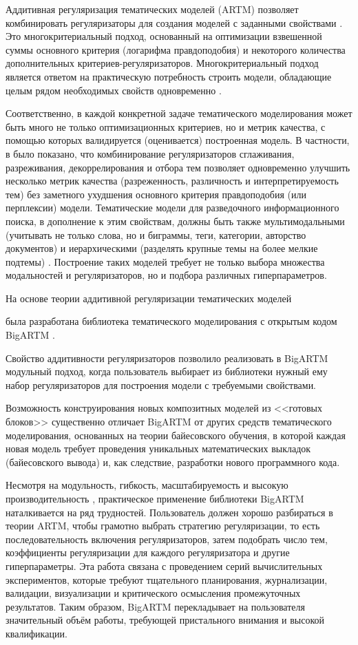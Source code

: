 Аддитивная регуляризация тематических моделей (ARTM) позволяет комбинировать регуляризаторы для создания моделей с заданными свойствами \cite{vorontsov2014additive,voron15mlj}. Это многокритериальный подход, основанный на оптимизации взвешенной суммы основного критерия (логарифма правдоподобия) и некоторого количества дополнительных критериев-регуляризаторов. Многокритериальный подход является ответом на практическую потребность строить модели, обладающие целым рядом необходимых свойств одновременно \cite{kochedykov2017fast}.

Соответственно, в каждой конкретной задаче тематического моделирования может быть много не только оптимизационных критериев, но и метрик качества, с помощью которых валидируется (оценивается) построенная модель. В частности, в \cite{voron15mlj,voron15mlj} было показано, что комбинирование регуляризаторов сглаживания, разреживания, декоррелирования и отбора тем позволяет одновременно улучшить несколько метрик качества (разреженность, различность и интерпретируемость тем) без заметного ухудшения основного критерия правдоподобия (или перплексии) модели. Тематические модели для разведочного информационного поиска, в дополнение к этим свойствам, должны быть также мультимодальными (учитывать не только слова, но и биграммы, теги, категории, авторство документов) и иерархическими (разделять крупные темы на более мелкие подтемы) \cite{ianina2019regularized}. Построение таких моделей требует не только выбора множества модальностей и регуляризаторов, но и подбора различных гиперпараметров.

На основе теории аддитивной регуляризации тематических моделей

была разработана библиотека тематического моделирования с открытым кодом BigARTM \cite{vorontsov2015bigartm,frei2016parallel}.

Свойство аддитивности регуляризаторов позволило реализовать в BigARTM модульный подход, когда пользователь выбирает из библиотеки нужный ему набор регуляризаторов для построения модели с требуемыми свойствами.

Возможность конструирования новых композитных моделей из <<готовых блоков>> существенно отличает BigARTM от других средств тематического моделирования, основанных на теории байесовского обучения, в которой каждая новая модель требует проведения уникальных математических выкладок (байесовского вывода) и, как следствие, разработки нового программного кода.

Несмотря на модульность, гибкость, масштабируемость и высокую производительность \cite{kochedykov2017fast}, практическое применение библиотеки BigARTM наталкивается на ряд трудностей. Пользователь должен хорошо разбираться в теории ARTM, чтобы грамотно выбрать стратегию регуляризации, то есть последовательность включения регуляризаторов, затем подобрать число тем, коэффициенты регуляризации для каждого регуляризатора и другие гиперпараметры. Эта работа связана с проведением серий вычислительных экспериментов, которые требуют тщательного планирования, журнализации, валидации, визуализации и критического осмысления промежуточных результатов. Таким образом, BigARTM перекладывает на пользователя значительный объём работы, требующей пристального внимания и высокой квалификации.


